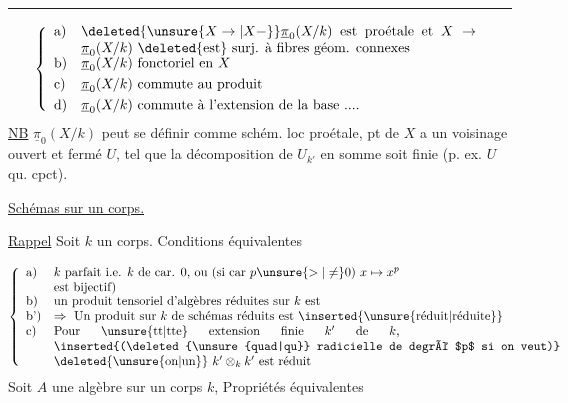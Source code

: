 \par\noindent\rule{.20\linewidth}{.4pt}\par
\[
\left\{\begin{array}{ll}
\text{a)} & \parbox[t]{.82\linewidth}{$\deleted{\unsure{X\to|X-}}\underline{\pi}_0(X/k)$ est proétale et $X\to\underline{\pi}_0(X/k)$ \deleted{est} surj. à fibres géom. connexes}\\[.7ex]
\text{b)} & \underline{\pi}_0(X/k)\ \text{fonctoriel en }X\\[.7ex]
\text{c)} & \underline{\pi}_0(X/k)\ \text{commute au produit}\\[.7ex]
\text{d)} & \underline{\pi}_0(X/k)\ \text{commute à l'extension de la base ....}
\end{array}\right.
\]
\uline{NB} $\underline{\pi}_0(X/k)$ peut se définir comme schém. loc proétale,   pt de  $X$ a un voisinage ouvert et fermé $U$, tel que  la décomposition de $U_{k'}$ en somme   soit finie (p. ex. $U$ qu. cpct).

\uline{Schémas sur un corps.}



\uline{Rappel} Soit $k$ un corps. Conditions équivalentes

\[
\left\{\begin{array}{ll}
\text{a)}&\parbox[t]{.80\linewidth}{$k$ parfait i.e. $k$ de car. $0$, ou (si car $p\unsure{>|\ne}0$) $x\mapsto x^p$ est bijectif)}\\
\text{b)}&\text{un produit tensoriel d'algèbres réduites sur }k\text{ est}\\
\text{b')}&\Rightarrow\ \text{Un produit sur }k\text{ de schémas réduits est \inserted{\unsure{réduit|réduite}}}\\
\text{c)}&\parbox[t]{.80\linewidth}{Pour \unsure{tt|tte} extension finie $k'$ de $k$, \inserted{(\deleted{\unsure{quad|qu}} radicielle de degré $p$ si on veut)} \deleted{\unsure{on|un}} $k' \otimes_k k'$ est réduit}
\end{array}\right.
\]
Soit $A$ une algèbre sur un corps $k$,  Propriétés équivalentes


